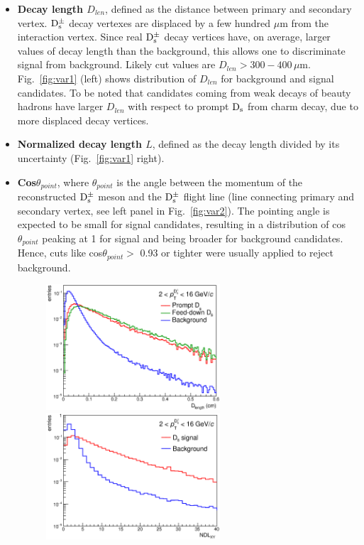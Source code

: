 \begin{itemize}
\item \textbf{Decay length $D_{len}$}, defined as the distance between
 primary and secondary vertex. ${\rm D_s^{\pm}}$ decay vertexes are displaced by
  a few hundred $\mu$m from the interaction vertex. Since real ${\rm D_s^{\pm}}$ 
  decay vertices have, on average, larger values of decay length than the
   background, this allows one to discriminate signal from background. 
   Likely cut values are $D_{len} > 300-400\, \mu $m. Fig.~\ref{fig:var1} (left) 
   shows distribution of $D_{len}$ for background and signal candidates.
   To be noted that candidates coming from weak decays of beauty hadrons have larger $D_{len}$
   with respect to prompt ${\rm D_s}$ from charm decay, due to more displaced decay vertices.
\item \textbf{Normalized decay length $L$}, defined as the decay length 
divided by its uncertainty (Fig.~\ref{fig:var1} right).
\item \textbf{Cos$\theta_{point}$}, where $\theta_{point}$ is the angle
 between the momentum of the reconstructed ${\rm D_s^{\pm}}$ meson and the 
 ${\rm D_s^{\pm}}$ flight line (line connecting primary and secondary vertex, see
  left panel in Fig.~\ref{fig:var2}). The pointing angle is expected to be small for signal 
  candidates, resulting in a distribution of cos$\theta_{point}$ peaking at 1 for 
  signal and being broader for background candidates. Hence, cuts like 
  cos$\theta_{point} >$ 0.93 or tighter were usually applied to reject background.
\begin{figure}[!t]
\centering
\includegraphics[width=6.5cm]{FigCap4/DL.eps}
\includegraphics[width=6.5cm]{FigCap4/NDLxy.eps}

\end{figure}
\end{itemize}
